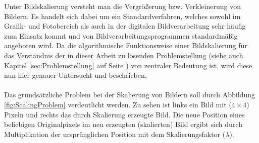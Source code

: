\documentclass[
fontsize=10pt, 
listof = totoc,
parskip = half	
]{report}
\begin{document}
Unter Bildskalierung versteht man die Vergrößerung bzw. Verkleinerung von Bildern. Es handelt sich dabei um ein Standardverfahren, welches sowohl im Grafik- und Fotobereich als auch in der digitalen Bildverarbeitung sehr häufig zum Einsatz kommt und von Bildverarbeitungsprogrammen standardmäßig angeboten wird. Da die algorithmische Funktionsweise einer Bildskalierung für das Verständnis der in dieser Arbeit zu lösenden Problemstellung (siehe auch Kapitel \ref{sec:Problemstellung} auf Seite \pageref{sec:Problemstellung}) von zentraler Bedeutung ist, wird diese nun hier genauer Untersucht und beschrieben.
\\\\
Das grundsätzliche Problem bei der Skalierung von Bildern soll durch Abbildung \ref{fig:ScalingProblem} verdeutlicht werden. Zu sehen ist links ein Bild mit ($4\times 4$) Pixeln und rechts das durch Skalierung erzeugte Bild. Die neue Position eines beliebigen Originalpixels im neu erzeugten (skalierten) Bild ergibt sich durch Multiplikation der ursprünglichen Position mit dem Skalierungsfaktor ($\lambda$).
\end{document}
